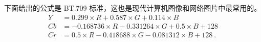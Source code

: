 

\begin{issues}
\issueDraft
\end{issues}

下面给出的公式是 BT.709 标准，这也是现代计算机图像和网络图片中最常用的。
\begin{equation}
\begin{aligned}
Y &= 0.299 \times R + 0.587 \times G + 0.114 \times B \\
Cb &= -0.168736 \times R - 0.331264 \times G + 0.5 \times B + 128 \\
Cr &= 0.5 \times R - 0.418688 \times G - 0.081312 \times B + 128~.
\end{aligned}
\end{equation}
